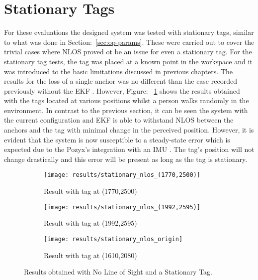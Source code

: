 \section{Stationary Tags}\label{sec:stationary-tags2}
For these evaluations the designed system was tested with stationary tags, similar to what was done in Section:~\ref{sec:op-params}.
These were carried out to cover the trivial cases where NLOS proved ot be an issue for even a stationary tag.
For the stationary tag tests, the tag was placed at a known point in the workspace and it was introduced to the basic limitations discussed in previous chapters.
The results for the loss of a single anchor was no different than the case recorded previously without the EKF .
However, Figure: ~\ref{fig:stat_anchors} shows the results obtained with the tags located at various positions whilst a person walks randomly in the environment.
In contrast to the previous section, it can be seen the system with the current configuration and EKF is able to withstand NLOS between the anchors and the tag with minimal change in the perceived position.
However, it is evident that the system is now susceptible to a steady-state error which is expected due to the Pozyx's integration with an IMU .
The tag's position will not change drastically and this error will be present as long as the tag is stationary.

\begin{figure}[h!]
    \centering
    \begin{subfigure}{0.49\textwidth}
            \texttt{[image: results/stationary\_nlos\_(1770,2500)]}
            \caption{Result with tag at (1770,2500)}
    \end{subfigure}
    \begin{subfigure}{0.49\textwidth}
            \texttt{[image: results/stationary\_nlos\_(1992,2595)]}
            \caption{Result with tag at (1992,2595)}
    \end{subfigure}
    \begin{subfigure}{0.5\textwidth}
            \texttt{[image: results/stationary\_nlos\_origin]}
            \caption{Result with tag at (1610,2080)}
    \end{subfigure}
    \caption{Results obtained with No Line of Sight and a Stationary Tag.}
    \label{fig:stat_anchors}
\end{figure}
\newpage

